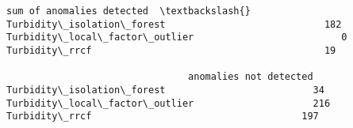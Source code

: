             \begin{tcolorbox}[breakable, size=fbox, boxrule=.5pt, pad at break*=1mm, opacityfill=0]
\begin{Verbatim}[commandchars=\\\{\}]
                                sum of anomalies detected  \textbackslash{}
Turbidity\_isolation\_forest                            182
Turbidity\_local\_factor\_outlier                          0
Turbidity\_rrcf                                         19

                                anomalies not detected
Turbidity\_isolation\_forest                          34
Turbidity\_local\_factor\_outlier                     216
Turbidity\_rrcf                                     197
\end{Verbatim}
\end{tcolorbox}
        
